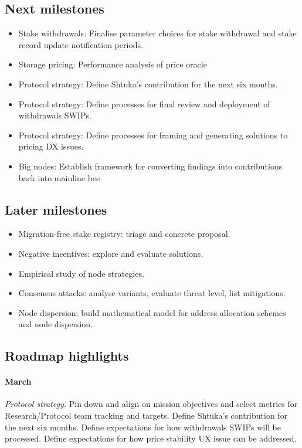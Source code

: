 \subsection*{Next milestones}

\begin{itemize}
  \item Stake withdrawals: Finalise parameter choices for stake withdrawal and stake record update notification periods.
  \item Storage pricing: Performance analysis of price oracle
  \item Protocol strategy: Define Shtuka's contribution for the next six months.
  \item Protocol strategy: Define processes for final review and deployment of withdrawals SWIPs.
  \item Protocol strategy: Define processes for framing and generating solutions to pricing DX issues.
  \item Big nodes: Establish framework for converting findings into contributions back into mainline bee
\end{itemize}

\subsection*{Later milestones}
\begin{itemize}
  \item Migration-free stake registry: triage and concrete proposal.
  \item Negative incentives: explore and evaluate solutions.
  \item Empirical study of node strategies.
  \item Consensus attacks: analyse variants, evaluate threat level, list mitigations.
  \item Node dispersion: build mathematical model for address allocation schemes and node dispersion.
\end{itemize}


\subsection*{Roadmap highlights}

\paragraph{March}
%
\emph{Protocol strategy.} 
%
Pin down and align on mission objectives and select metrics for Research/Protocol team tracking and targets.
%
Define Shtuka's contribution for the next six months.
%
Define expectations for how withdrawals SWIPs will be processed.
%
Define expectations for how price stability UX issue can be addressed.

